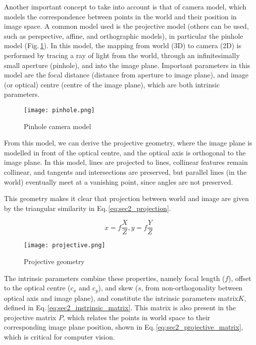 Another important concept to take into account is that of camera model, which models the correspondence between points in the world and their position in image space. A common model used is the projective model (others can be used, such as perspective, affine, and orthographic models), in particular the pinhole model (Fig.\,\ref{fig:sec2_pinhole}). In this model, the mapping from world (3D) to camera (2D) is performed by tracing a ray of light from the world, through an infinitesimally small aperture (pinhole), and into the image plane. Important parameters in this model are the focal distance (distance from aperture to image plane), and image (or optical) centre (centre of the image plane), which are both intrinsic parameters. 

\begin{figure}[ht]
    \centering
    \texttt{[image: pinhole.png]}
    \caption{Pinhole camera model}
    \label{fig:sec2_pinhole}
\end{figure}



From this model, we can derive the projective geometry, where the image plane is modelled in front of the optical centre, and the optical axis is orthogonal to the image plane. In this model, lines are projected to lines, collinear features remain collinear, and tangents and intersections are preserved, but parallel lines (in the world) eventually meet at a vanishing point, since angles are not preserved.

This geometry makes it clear that projection between world and image are given by the triangular similarity in Eq.\,\eqref{eq:sec2_projection}. 

\begin{equation}
    x=f\frac{X}{Z}, y=f\frac{Y}{Z}
    \label{eq:sec2_projection}
\end{equation}


\begin{figure}[ht]
    \centering
    \texttt{[image: projective.png]}
    \caption{Projective geometry}
    \label{fig:sec2_projective_geometry}
\end{figure}

The intrinsic parameters combine these properties, namely focal length ($f$), offset to the optical centre ($c_x$ and $c_y$), and skew ($s$, from non-orthogonality between optical axis and image plane), and constitute the intrinsic parameters matrix$K$, defined in Eq.\,\eqref{eq:sec2_instrinsic_matrix}. This matrix is also present in the projective matrix $P$, which relates the points in world space to their corresponding image plane position, shown in Eq.\,\eqref{eq:sec2_projective_matrix}, which is critical for computer vision.

